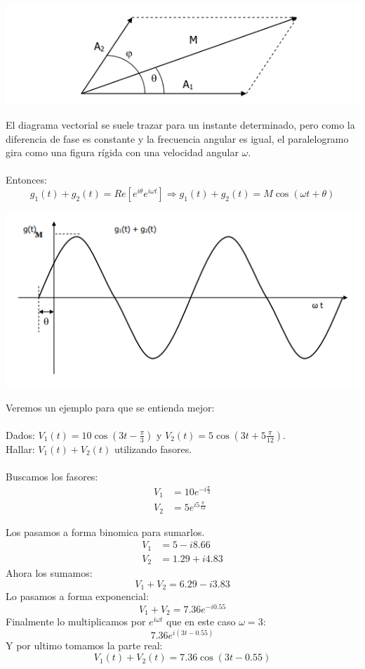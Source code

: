 \documentclass[]{article}
\begin{document}
\includegraphics{../../../Imagenes/Superior/Complejos/Complejos07.PNG}

El diagrama vectorial se suele trazar para un instante determinado, pero como la diferencia de fase es constante y la frecuencia angular es igual, el paralelogramo gira como una figura rígida con una velocidad angular $\omega$.
\\
\\
Entonces:
$$
g_1(t) + g_2(t) = Re[e^{i\theta}e^{i\omega t}] \Rightarrow g_1(t)+g_2(t) = M \cos(\omega t +\theta)
$$

\includegraphics{../../../Imagenes/Superior/Complejos/Complejos08.PNG}

Veremos un ejemplo para que se entienda mejor:
\\
\\
Dados: $V_1(t) = 10\cos(3t-\frac{\pi}{3})$ y $V_2(t) = 5\cos(3t+5\frac{\pi}{12})$.
\\
Hallar: $V_1(t) + V_2(t)$ utilizando fasores.
\\
\\
Buscamos los fasores:
\begin{align}
  V_1 &= 10 e^{-i\frac{\pi}{3}}\\
  V_2 &= 5 e^{i5\frac{\pi}{12}}
\end{align}

Los pasamos a forma binomica para sumarlos.
\begin{align}
  V_1 &= 5-i8.66\\
  V_2 &= 1.29+i4.83
\end{align}
Ahora los sumamos:
$$
V_1 + V_2 = 6.29 - i 3.83
$$
Lo pasamos a forma exponencial:
$$
V_1+V_2 = 7.36e^{-i0.55}
$$
Finalmente lo multiplicamos por $e^{i\omega t}$ que en este caso $\omega = 3$:
$$
7.36e^{i(3t-0.55)}
$$
Y por ultimo tomamos la parte real:
$$
V_1(t)+V_2(t) = 7.36\cos(3t-0.55)
$$
\end{document}

